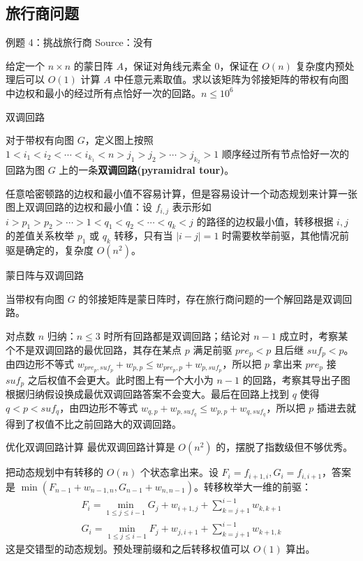 \documentclass{beamer}
\begin{document}
\subsection{旅行商问题}
\begin{frame}{例题 4：挑战旅行商}
	Source：没有
	
	给定一个 $n \times n$ 的蒙日阵 $A$，保证对角线元素全 $0$，保证在 $O(n)$ 复杂度内预处理后可以 $O(1)$ 计算 $A$ 中任意元素取值。求以该矩阵为邻接矩阵的带权有向图中边权和最小的经过所有点恰好一次的回路。$n \leq 10^6$
\end{frame}
\begin{frame}{双调回路}
	\begin{definition}[双调回路]
		对于带权有向图 $G$，定义图上按照 $1<i_1<i_2<\cdots<i_{k_1}<n>j_1>j_2>\cdots>j_{k_2}>1$ 顺序经过所有节点恰好一次的回路为图 $G$ 上的一条\textbf{双调回路(pyramidral tour)}。
	\end{definition}
	任意哈密顿路的边权和最小值不容易计算，但是容易设计一个动态规划来计算一张图上双调回路的边权和最小值：设 $f_{i,j}$ 表示形如 $i>p_1>p_2>\cdots>1<q_1<q_2<\cdots<q_k<j$ 的路径的边权最小值，转移根据 $i,j$ 的差值关系枚举 $p_1$ 或 $q_k$ 转移，只有当 $|i-j|=1$ 时需要枚举前驱，其他情况前驱是确定的，复杂度 $O(n^2)$。
\end{frame}
\begin{frame}{蒙日阵与双调回路}
	\begin{theorem}
		当带权有向图 $G$ 的邻接矩阵是蒙日阵时，存在旅行商问题的一个解回路是双调回路。
	\end{theorem}\pause
	对点数 $n$ 归纳：$n \leq 3$ 时所有回路都是双调回路；结论对 $n-1$ 成立时，考察某个不是双调回路的最优回路，其存在某点 $p$ 满足前驱 $pre_p < p$ 且后继 $suf_p < p$。由四边形不等式 $w_{pre_p,suf_p}+w_{p,p} \leq w_{pre_p,p}+w_{p,suf_p}$，所以把 $p$ 拿出来 $pre_p$ 接 $suf_p$ 之后权值不会更大。此时图上有一个大小为 $n-1$ 的回路，考察其导出子图根据归纳假设换成最优双调回路答案不会变大。最后在回路上找到 $q$ 使得 $q<p<suf_q$，由四边形不等式 $w_{q,p}+w_{p,suf_q} \leq w_{p,p}+w_{q,suf_q}$，所以把 $p$ 插进去就得到了权值不比之前回路大的双调回路。
\end{frame}
\begin{frame}{优化双调回路计算}
	最优双调回路计算是 $O(n^2)$ 的，摆脱了指数级但不够优秀。
	
	把动态规划中有转移的 $O(n)$ 个状态拿出来。设 $F_i = f_{i+1,i},G_i = f_{i,i+1}$，答案是 $\min(F_{n-1}+w_{n-1,n},G_{n-1}+w_{n,n-1})$。转移枚举大一维的前驱：
	\begin{gather*}
		F_i = \min_{1 \leq j \leq i-1} G_j+w_{i+1,j}+\sum_{k=j+1}^{i-1}w_{k,k+1} \\
		G_i = \min_{1 \leq j \leq i-1} F_j+w_{j,i+1}+\sum_{k=j+1}^{i-1}w_{k+1,k}
	\end{gather*}
	这是交错型的动态规划。预处理前缀和之后转移权值可以 $O(1)$ 算出。
\end{frame}
\end{document}
